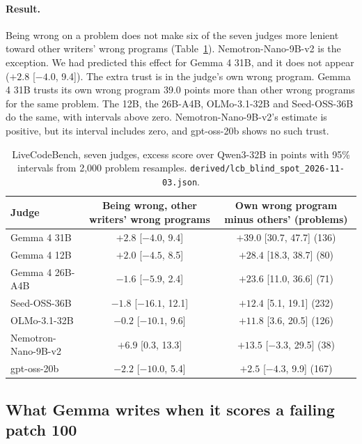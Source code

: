 \documentclass[10pt,letterpaper]{article}
\begin{document}
\paragraph{Result.} Being wrong on a problem does not make six of the seven judges more lenient toward other writers'
wrong programs (Table~\ref{tab:blindspot}). Nemotron-Nano-9B-v2 is the exception. We had predicted this effect for %
Gemma 4 31B, and it does not appear ($+2.8$ [$-4.0$, 9.4]). The extra trust is in the judge's own wrong program. Gemma 4
31B trusts its own wrong program 39.0 points more than other wrong programs for the same problem. The 12B, the
26B-A4B, OLMo-3.1-32B and Seed-OSS-36B do the same, with intervals above zero. Nemotron-Nano-9B-v2's estimate is %
positive, but its interval includes zero, and gpt-oss-20b shows no such trust.

\begin{table}[H]
\centering
\small
\caption{LiveCodeBench, seven judges, excess score over Qwen3-32B in points with 95\% intervals from 2,000 problem
resamples. \texttt{derived/lcb\_blind\_spot\_2026-11-03.json}.}
\label{tab:blindspot}
\begin{tabular}{@{}lcc@{}}
\toprule
Judge & Being wrong, other writers' wrong programs & Own wrong program minus others' (problems) \\
\midrule
Gemma 4 31B & $+2.8$ [$-4.0$, 9.4] & $+39.0$ [30.7, 47.7] (136) \\
Gemma 4 12B & $+2.0$ [$-4.5$, 8.5] & $+28.4$ [18.3, 38.7] (80) \\
Gemma 4 26B-A4B & $-1.6$ [$-5.9$, 2.4] & $+23.6$ [11.0, 36.6] (71) \\
Seed-OSS-36B & $-1.8$ [$-16.1$, 12.1] & $+12.4$ [5.1, 19.1] (232) \\
OLMo-3.1-32B & $-0.2$ [$-10.1$, 9.6] & $+11.8$ [3.6, 20.5] (126) \\
Nemotron-Nano-9B-v2 & $+6.9$ [0.3, 13.3] & $+13.5$ [$-3.3$, 29.5] (38) \\
gpt-oss-20b & $-2.2$ [$-10.0$, 5.4] & $+2.5$ [$-4.3$, 9.9] (167) \\
\bottomrule
\end{tabular}
\end{table}

\subsection*{What Gemma writes when it scores a failing patch 100}
\end{document}
